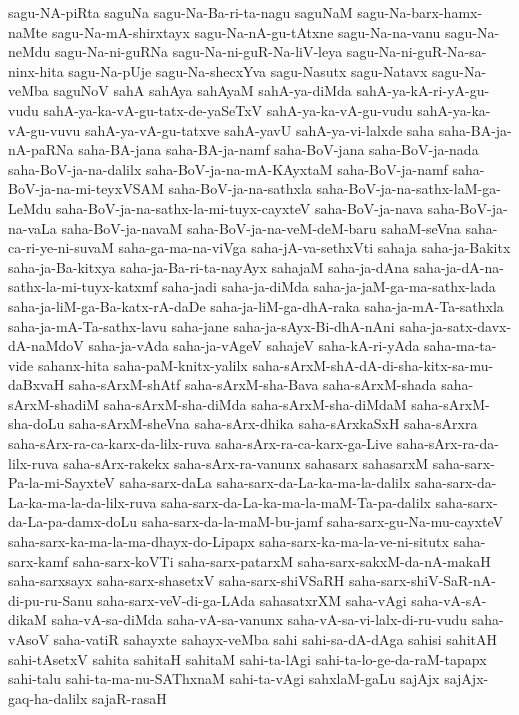 {sagu-NA-piRta
saguNa
sagu-Na-Ba-ri-ta-nagu
saguNaM
sagu-Na-barx-hamx-naMte
sagu-Na-mA-shirxtayx
sagu-Na-nA-gu-tAtxne
sagu-Na-na-vanu
sagu-Na-neMdu
sagu-Na-ni-guRNa
sagu-Na-ni-guR-Na-liV-leya
sagu-Na-ni-guR-Na-sa-ninx-hita
sagu-Na-pUje
sagu-Na-shecxYva
sagu-Nasutx
sagu-Natavx
sagu-Na-veMba
saguNoV
sahA
sahAya
sahAyaM
sahA-ya-diMda
sahA-ya-kA-ri-yA-gu-vudu
sahA-ya-ka-vA-gu-tatx-de-yaSeTxV
sahA-ya-ka-vA-gu-vudu
sahA-ya-ka-vA-gu-vuvu
sahA-ya-vA-gu-tatxve
sahA-yavU
sahA-ya-vi-lalxde
saha
saha-BA-ja-nA-paRNa
saha-BA-jana
saha-BA-ja-namf
saha-BoV-jana
saha-BoV-ja-nada
saha-BoV-ja-na-dalilx
saha-BoV-ja-na-mA-KAyxtaM
saha-BoV-ja-namf
saha-BoV-ja-na-mi-teyxVSAM
saha-BoV-ja-na-sathxla
saha-BoV-ja-na-sathx-laM-ga-LeMdu
saha-BoV-ja-na-sathx-la-mi-tuyx-cayxteV
saha-BoV-ja-nava
saha-BoV-ja-na-vaLa
saha-BoV-ja-navaM
saha-BoV-ja-na-veM-deM-baru
sahaM-seVna
saha-ca-ri-ye-ni-suvaM
saha-ga-ma-na-viVga
saha-jA-va-sethxVti
sahaja
saha-ja-Bakitx
saha-ja-Ba-kitxya
saha-ja-Ba-ri-ta-nayAyx
sahajaM
saha-ja-dAna
saha-ja-dA-na-sathx-la-mi-tuyx-katxmf
saha-jadi
saha-ja-diMda
saha-ja-jaM-ga-ma-sathx-lada
saha-ja-liM-ga-Ba-katx-rA-daDe
saha-ja-liM-ga-dhA-raka
saha-ja-mA-Ta-sathxla
saha-ja-mA-Ta-sathx-lavu
saha-jane
saha-ja-sAyx-Bi-dhA-nAni
saha-ja-satx-davx-dA-naMdoV
saha-ja-vAda
saha-ja-vAgeV
sahajeV
saha-kA-ri-yAda
saha-ma-ta-vide
sahanx-hita
saha-paM-knitx-yalilx
saha-sArxM-shA-dA-di-sha-kitx-sa-mu-daBxvaH
saha-sArxM-shAtf
saha-sArxM-sha-Bava
saha-sArxM-shada
saha-sArxM-shadiM
saha-sArxM-sha-diMda
saha-sArxM-sha-diMdaM
saha-sArxM-sha-doLu
saha-sArxM-sheVna
saha-sArx-dhika
saha-sArxkaSxH
saha-sArxra
saha-sArx-ra-ca-karx-da-lilx-ruva
saha-sArx-ra-ca-karx-ga-Live
saha-sArx-ra-da-lilx-ruva
saha-sArx-rakekx
saha-sArx-ra-vanunx
sahasarx
sahasarxM
saha-sarx-Pa-la-mi-SayxteV
saha-sarx-daLa
saha-sarx-da-La-ka-ma-la-dalilx
saha-sarx-da-La-ka-ma-la-da-lilx-ruva
saha-sarx-da-La-ka-ma-la-maM-Ta-pa-dalilx
saha-sarx-da-La-pa-damx-doLu
saha-sarx-da-la-maM-bu-jamf
saha-sarx-gu-Na-mu-cayxteV
saha-sarx-ka-ma-la-ma-dhayx-do-Lipapx
saha-sarx-ka-ma-la-ve-ni-situtx
saha-sarx-kamf
saha-sarx-koVTi
saha-sarx-patarxM
saha-sarx-sakxM-da-nA-makaH
saha-sarxsayx
saha-sarx-shasetxV
saha-sarx-shiVSaRH
saha-sarx-shiV-SaR-nA-di-pu-ru-Sanu
saha-sarx-veV-di-ga-LAda
sahasatxrXM
saha-vAgi
saha-vA-sA-dikaM
saha-vA-sa-diMda
saha-vA-sa-vanunx
saha-vA-sa-vi-lalx-di-ru-vudu
saha-vAsoV
saha-vatiR
sahayxte
sahayx-veMba
sahi
sahi-sa-dA-dAga
sahisi
sahitAH
sahi-tAsetxV
sahita
sahitaH
sahitaM
sahi-ta-lAgi
sahi-ta-lo-ge-da-raM-tapapx
sahi-talu
sahi-ta-ma-nu-SAThxnaM
sahi-ta-vAgi
sahxlaM-gaLu
sajAjx
sajAjx-gaq-ha-dalilx
sajaR-rasaH
}
